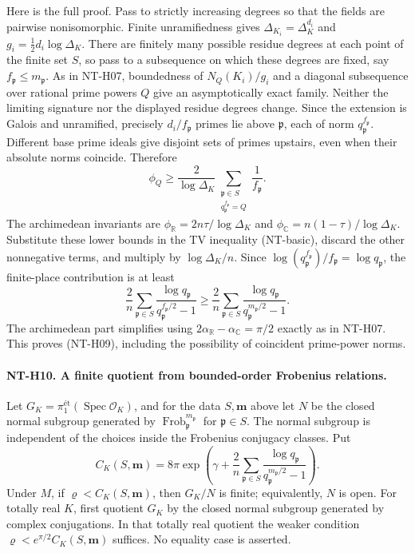 Here is the full proof.  Pass to strictly increasing degrees so that
the fields are pairwise nonisomorphic.  Finite unramifiedness gives
$\Delta_{K_i}=\Delta_K^{d_i}$ and
$g_i=\tfrac12 d_i\log\Delta_K$.
There are finitely many possible residue degrees at each point of
the finite set $S$, so pass to a subsequence on which these degrees
are fixed, say $f_{\mathfrak p}\le m_{\mathfrak p}$.
As in NT-H07, boundedness of $N_Q(K_i)/g_i$ and a diagonal
subsequence over rational prime powers $Q$ give an asymptotically
exact family.  Neither the limiting signature nor the displayed
residue degrees change.  Since the extension is Galois and
unramified, precisely $d_i/f_{\mathfrak p}$ primes lie above
$\mathfrak p$, each of norm $q_{\mathfrak p}^{f_{\mathfrak p}}$.
Different base prime ideals give disjoint sets of primes upstairs,
even when their absolute norms coincide.  Therefore
\[
 \phi_Q\ge\frac2{\log\Delta_K}
       \sum_{\substack{\mathfrak p\in S\\
                    q_{\mathfrak p}^{f_{\mathfrak p}}=Q}}
           \frac1{f_{\mathfrak p}}.
\]
The archimedean invariants are
$\phi_{\mathbb R}=2n\tau/\log\Delta_K$ and
$\phi_{\mathbb C}=n(1-\tau)/\log\Delta_K$.
Substitute these lower bounds in the TV inequality (NT-basic),
discard the other nonnegative terms, and multiply by
$\log\Delta_K/n$.  Since
$\log(q_{\mathfrak p}^{f_{\mathfrak p}})/f_{\mathfrak p}
=\log q_{\mathfrak p}$, the finite-place contribution is at least
\[
 \frac2n\sum_{\mathfrak p\in S}
      \frac{\log q_{\mathfrak p}}
           {q_{\mathfrak p}^{f_{\mathfrak p}/2}-1}
 \ge\frac2n\sum_{\mathfrak p\in S}
      \frac{\log q_{\mathfrak p}}
           {q_{\mathfrak p}^{m_{\mathfrak p}/2}-1}.
\]
The archimedean part simplifies using
$2\alpha_{\mathbb R}-\alpha_{\mathbb C}=\pi/2$ exactly as in
NT-H07.  This proves (NT-H09), including the possibility of
coincident prime-power norms.

\paragraph{NT-H10. A finite quotient from bounded-order Frobenius relations.}
Let
$G_K=\pi_1^{\text{ét}}(\operatorname{Spec}\mathcal O_K)$, and
for the data $S,\boldsymbol m$ above let $N$ be the closed normal
subgroup generated by
$\operatorname{Frob}_{\mathfrak p}^{m_{\mathfrak p}}$ for
$\mathfrak p\in S$.  The normal subgroup is independent of the
choices inside the Frobenius conjugacy classes.  Put
\[
 C_K(S,\boldsymbol m)=8\pi\exp\left(
       \gamma+\frac2n\sum_{\mathfrak p\in S}
       \frac{\log q_{\mathfrak p}}
            {q_{\mathfrak p}^{m_{\mathfrak p}/2}-1}\right).
\]
Under $M$, if $\varrho<C_K(S,\boldsymbol m)$, then $G_K/N$ is
finite; equivalently, $N$ is open.  For totally real $K$, first
quotient $G_K$ by the closed normal subgroup generated by complex
conjugations.  In that totally real quotient the weaker condition
$\varrho<e^{\pi/2}C_K(S,\boldsymbol m)$ suffices.  No equality
case is asserted.

